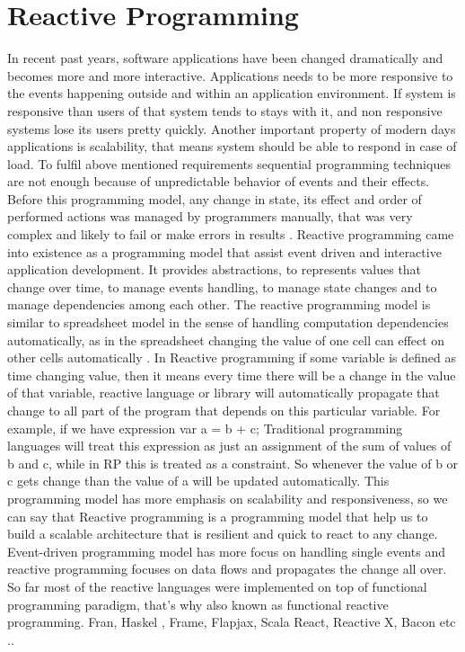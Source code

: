 \section{Reactive Programming}
In recent past years, software applications have been changed dramatically and becomes more and more interactive. Applications needs to be more responsive to the events happening outside and within an application environment. If system is responsive than users of that system tends to stays with it, and non responsive systems lose its users pretty quickly. Another important property of modern days applications is scalability, that means system should be able to respond in case of load. To fulfil above mentioned requirements sequential programming techniques are not enough because of unpredictable behavior of events and their effects. Before this programming model, any change in state, its effect and order of performed actions was managed by programmers manually, that was very complex and likely to fail or make errors in results \citep{Edwards:2009:CR:1639950.1640058}.
Reactive programming came into existence as a programming model that assist event driven and interactive application development. It provides abstractions, to represents values that change over time, to manage events handling, to manage state changes and to manage dependencies among each other. The reactive programming model is similar to spreadsheet model in the sense of handling computation dependencies automatically, as in the spreadsheet changing the value of one cell can effect on other cells automatically \citep{Bainomugisha:2013:SRP:2501654.2501666}. In Reactive programming if some variable is defined as time changing value, then it means every time there will be a change in the value of that variable, reactive language or library will automatically propagate that change to all part of the program that depends on this particular variable.
For example, if we have expression var a = b + c; Traditional programming languages will treat this expression as just an assignment of the sum of values of b and c, while in RP this is treated as a constraint. So whenever the value of b or c gets change than the value of a will be updated automatically.
This programming model has more emphasis on scalability and responsiveness, so we can say that Reactive programming is a programming model that help us to build a scalable architecture that is resilient and quick to react to any change. Event-driven programming model has more focus on handling single events and reactive programming focuses on data flows and propagates the change all over.
So far most of the reactive languages were implemented on top of functional programming paradigm, that's why also known as functional reactive programming. 
Fran, Haskel , Frame, Flapjax, Scala React, Reactive X, Bacon etc ..

